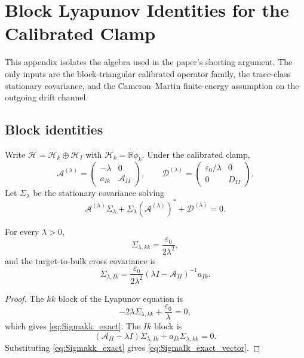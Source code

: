 \section{Block Lyapunov Identities for the Calibrated Clamp}
\label{app:block_identities}

This appendix isolates the algebra used in the paper's shorting argument.  The
only inputs are the block-triangular calibrated operator family, the trace-class
stationary covariance, and the Cameron--Martin finite-energy assumption on the
outgoing drift channel.

\subsection{Block identities}

Write $\mathcal{H}=\mathcal{H}_k\oplus\mathcal{H}_I$ with
$\mathcal{H}_k=\mathbb{R}\phi_k$.  Under the calibrated clamp,
\begin{equation}
 \mathcal{A}^{(\lambda)}=
 \begin{pmatrix}-\lambda&0\\a_{Ik}&\mathcal{A}_{II}\end{pmatrix},
 \qquad
 \mathcal{D}^{(\lambda)}=
 \begin{pmatrix}\varepsilon_0/\lambda&0\\0&D_{II}\end{pmatrix}.
 \label{eq:exact_blocks}
\end{equation}
Let $\Sigma_\lambda$ be the stationary covariance solving
\[
  \mathcal{A}^{(\lambda)}\Sigma_\lambda
  +\Sigma_\lambda(\mathcal{A}^{(\lambda)})^*
  +\mathcal{D}^{(\lambda)}=0.
\]

\begin{lemma}
\label{lem:block_lyapunov_identities}
For every $\lambda>0$,
\begin{equation}
  \Sigma_{\lambda,kk}=\frac{\varepsilon_0}{2\lambda^2},
  \label{eq:Sigmakk_exact}
\end{equation}
and the target-to-bulk cross covariance is
\begin{equation}
  \Sigma_{\lambda,Ik}
  =\frac{\varepsilon_0}{2\lambda^2}
    (\lambda I-\mathcal{A}_{II})^{-1}a_{Ik}.
  \label{eq:SigmaIk_exact_vector}
\end{equation}
\end{lemma}

\begin{proof}
The $kk$ block of the Lyapunov equation is
\[
  -2\lambda\Sigma_{\lambda,kk}+\frac{\varepsilon_0}{\lambda}=0,
\]
which gives \eqref{eq:Sigmakk_exact}.  The $Ik$ block is
\[
  (\mathcal{A}_{II}-\lambda I)\Sigma_{\lambda,Ik}
  +a_{Ik}\Sigma_{\lambda,kk}=0.
\]
Substituting \eqref{eq:Sigmakk_exact} gives
\eqref{eq:SigmaIk_exact_vector}.
\end{proof}

